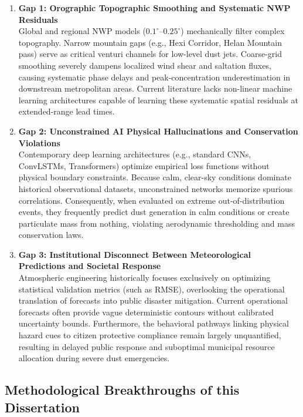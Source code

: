 \begin{enumerate}
    \item \textbf{Gap 1: Orographic Topographic Smoothing and Systematic NWP Residuals} \\
    Global and regional NWP models ($0.1^\circ\text{--}0.25^\circ$) mechanically filter complex topography. Narrow mountain gaps (e.g., Hexi Corridor, Helan Mountain pass) serve as critical venturi channels for low-level dust jets. Coarse-grid smoothing severely dampens localized wind shear and saltation fluxes, causing systematic phase delays and peak-concentration underestimation in downstream metropolitan areas. Current literature lacks non-linear machine learning architectures capable of learning these systematic spatial residuals at extended-range lead times.

    \item \textbf{Gap 2: Unconstrained AI Physical Hallucinations and Conservation Violations} \\
    Contemporary deep learning architectures (e.g., standard CNNs, ConvLSTMs, Transformers) optimize empirical loss functions without physical boundary constraints. Because calm, clear-sky conditions dominate historical observational datasets, unconstrained networks memorize spurious correlations. Consequently, when evaluated on extreme out-of-distribution events, they frequently predict dust generation in calm conditions or create particulate mass from nothing, violating aerodynamic thresholding and mass conservation laws.

    \item \textbf{Gap 3: Institutional Disconnect Between Meteorological Predictions and Societal Response} \\
    Atmospheric engineering historically focuses exclusively on optimizing statistical validation metrics (such as RMSE), overlooking the operational translation of forecasts into public disaster mitigation. Current operational forecasts often provide vague deterministic contours without calibrated uncertainty bounds. Furthermore, the behavioral pathways linking physical hazard cues to citizen protective compliance remain largely unquantified, resulting in delayed public response and suboptimal municipal resource allocation during severe dust emergencies.
\end{enumerate}

\subsection{Methodological Breakthroughs of this Dissertation}
\label{subsec:thesis_breakthrough}

